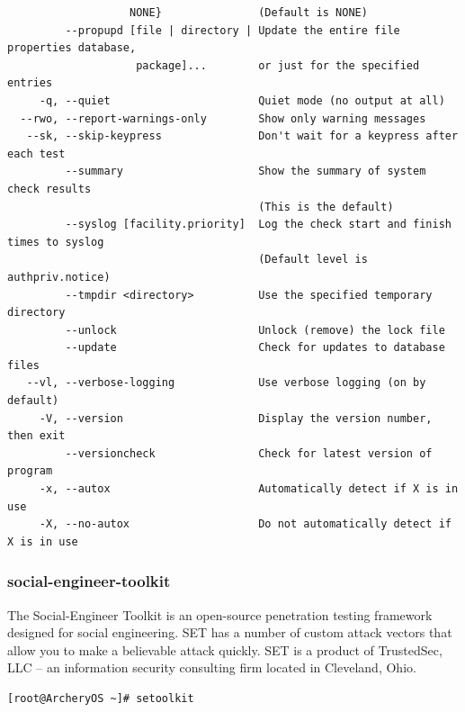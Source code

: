\documentclass{article}
\begin{document}
\begin{lstlisting}
                   NONE}               (Default is NONE)
         --propupd [file | directory | Update the entire file properties database,
                    package]...        or just for the specified entries
     -q, --quiet                       Quiet mode (no output at all)
  --rwo, --report-warnings-only        Show only warning messages
   --sk, --skip-keypress               Don't wait for a keypress after each test
         --summary                     Show the summary of system check results
                                       (This is the default)
         --syslog [facility.priority]  Log the check start and finish times to syslog
                                       (Default level is authpriv.notice)
         --tmpdir <directory>          Use the specified temporary directory
         --unlock                      Unlock (remove) the lock file
         --update                      Check for updates to database files
   --vl, --verbose-logging             Use verbose logging (on by default)
     -V, --version                     Display the version number, then exit
         --versioncheck                Check for latest version of program
     -x, --autox                       Automatically detect if X is in use
     -X, --no-autox                    Do not automatically detect if X is in use
\end{lstlisting}

\subsubsection{social-engineer-toolkit}
The Social-Engineer Toolkit is an open-source penetration testing framework designed for social engineering. SET has a number of custom attack vectors that allow you to make a believable attack quickly. SET is a product of TrustedSec, LLC – an information security consulting firm located in Cleveland, Ohio.
\begin{lstlisting}
[root@ArcheryOS ~]# setoolkit
\end{lstlisting}
\end{document}
